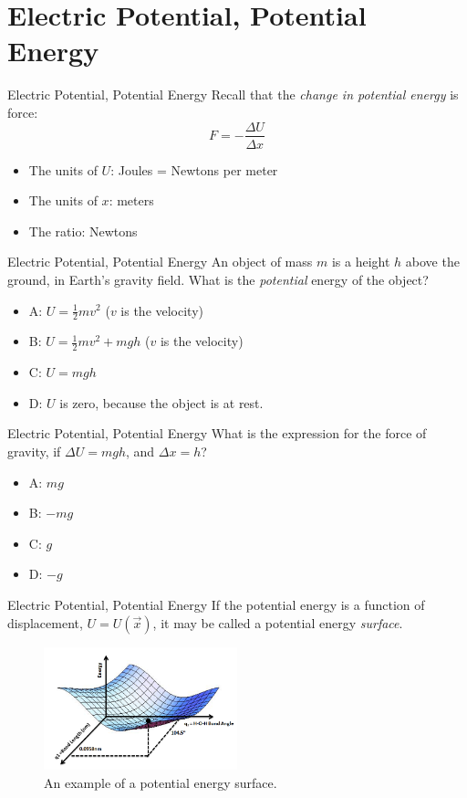 \documentclass{beamer}
\begin{document}
\section{Electric Potential, Potential Energy}

\begin{frame}{Electric Potential, Potential Energy}
Recall that the \textit{change in potential energy} is force:
\begin{equation}
F = -\frac{\Delta U}{\Delta x}
\end{equation}
\begin{itemize}
\item The units of $U$: Joules = Newtons per meter
\item The units of $x$: meters
\item The ratio: Newtons
\end{itemize}
\end{frame}

\begin{frame}{Electric Potential, Potential Energy}
An object of mass $m$ is a height $h$ above the ground, in Earth's gravity field.  What is the \textit{potential} energy of the object?
\begin{itemize}
\item A: $U = \frac{1}{2}mv^2$ ($v$ is the velocity)
\item B: $U = \frac{1}{2}mv^2 + mgh$ ($v$ is the velocity)
\item C: $U = mgh$
\item D: $U$ is zero, because the object is at rest.
\end{itemize}
\end{frame}

\begin{frame}{Electric Potential, Potential Energy}
What is the expression for the force of gravity, if $\Delta U = mgh$, and $\Delta x = h$?
\begin{itemize}
\item A: $mg$
\item B: $-mg$
\item C: $g$
\item D: $-g$
\end{itemize}
\end{frame}

\begin{frame}{Electric Potential, Potential Energy}
\small
If the potential energy is a function of displacement, $U = U(\vec{x})$, it may be called a potential energy \textit{surface}.
\begin{figure}
\centering
\includegraphics[width=0.5\textwidth]{figures/potential.png}
\caption{\label{fig:potential} An example of a potential energy surface.}
\end{figure}
\end{frame}
\end{document}
